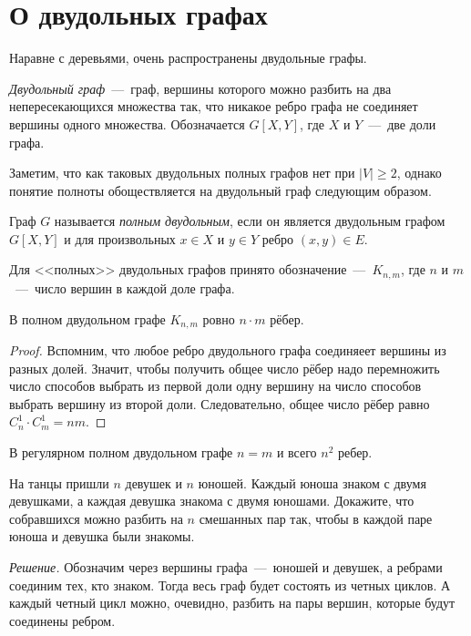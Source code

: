 \section{О двудольных графах}

Наравне с деревьями, очень распространены двудольные графы.
	
	
\begin{definition}
	\emph{Двудольный граф}~---~граф, вершины которого можно разбить на два непересекающихся множества так, 
	что никакое ребро графа не соединяет вершины одного множества. Обозначается $G[X, Y]$, где $X$ и $Y$~---~две доли графа.
\end{definition}

	Заметим, что как таковых двудольных полных графов нет при $|V| \geqslant 2$, 
	однако понятие полноты обоществляется на двудольный граф следующим образом.
	
\begin{definition}
	Граф $G$ называется \emph{полным двудольным}, если он является двудольным графом $G[X, Y]$ и 
	для произвольных $x \in X$ и $y \in Y$ ребро $(x, y) \in E$.
\end{definition}

	Для <<полных>> двудольных графов принято обозначение~---~$K_{n,m}$, где $n$ и $m$~---~число вершин в каждой доле графа.

\begin{statement}
	В полном двудольном графе $K_{n, m}$ ровно $n\cdot m$ рёбер.
	
\begin{proof}	
	Вспомним, что любое ребро двудольного графа соединяеет вершины из разных долей. 
	Значит, чтобы получить общее число рёбер надо перемножить число способов выбрать из первой доли одну 
	вершину на число способов выбрать вершину из второй доли. Следовательно, общее число рёбер равно $C_n^1 \cdot C_m^1 = nm$.
\end{proof}
\end{statement}
	
\begin{consequence}
	В регулярном полном двудольном графе $n = m$ и всего $n^2$ ребер.
\end{consequence}	
	
\begin{example}
	На танцы пришли $n$ девушек и $n$ юношей. Каждый юноша знаком с двумя девушками, 
	а каждая девушка знакома с двумя юношами. Докажите, что собравшихся можно разбить на $n$ смешанных пар так, 
	чтобы в каждой паре юноша и девушка были знакомы.
	
	\emph{Решение.} Обозначим через вершины графа~---~юношей и девушек, а ребрами соединим тех, кто знаком. 
	Тогда весь граф будет состоять из четных циклов. А каждый четный цикл можно, очевидно, 
	разбить на пары вершин, которые будут соединены ребром.
\end{example}


